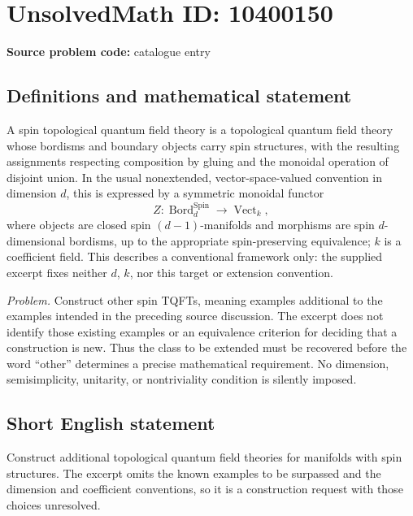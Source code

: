 \documentclass[11pt]{article}
\begin{document}
\section*{UnsolvedMath ID: 10400150}
\textbf{Source problem code:} catalogue entry
\subsection{Definitions and mathematical statement}
A spin topological quantum field theory is a topological quantum field theory whose bordisms and boundary objects carry spin structures, with the resulting assignments respecting composition by gluing and the monoidal operation of disjoint union. In the usual nonextended, vector-space-valued convention in dimension \(d\), this is expressed by a symmetric monoidal functor
\[
 Z:\operatorname{Bord}^{\mathrm{Spin}}_d\longrightarrow\operatorname{Vect}_k,
\]
where objects are closed spin \((d-1)\)-manifolds and morphisms are spin \(d\)-dimensional bordisms, up to the appropriate spin-preserving equivalence; \(k\) is a coefficient field. This describes a conventional framework only: the supplied excerpt fixes neither \(d\), \(k\), nor this target or extension convention.

\emph{Problem.} Construct other spin TQFTs, meaning examples additional to the examples intended in the preceding source discussion. The excerpt does not identify those existing examples or an equivalence criterion for deciding that a construction is new. Thus the class to be extended must be recovered before the word ``other'' determines a precise mathematical requirement. No dimension, semisimplicity, unitarity, or nontriviality condition is silently imposed.
\subsection{Short English statement}
Construct additional topological quantum field theories for manifolds with spin structures. The excerpt omits the known examples to be surpassed and the dimension and coefficient conventions, so it is a construction request with those choices unresolved.
\end{document}
